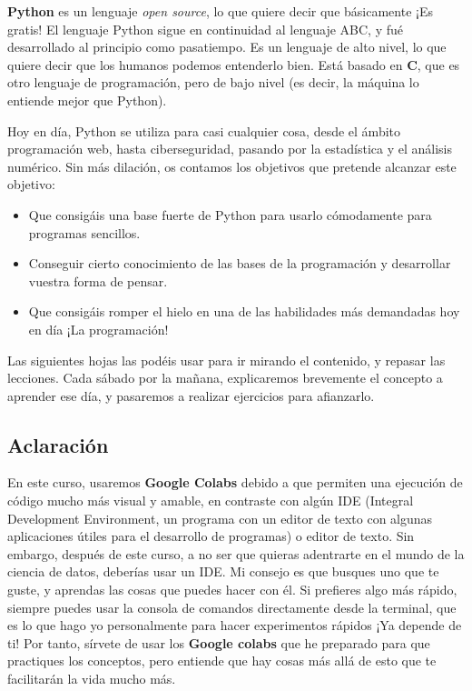 \documentclass{article}
\begin{document}
\textbf{Python} es un lenguaje \textit{open source}, lo que quiere decir que básicamente ¡Es gratis! El lenguaje Python sigue en continuidad al lenguaje ABC, y fué desarrollado al principio como pasatiempo. Es un lenguaje de alto nivel, lo que quiere decir que los humanos podemos entenderlo bien. Está basado en \textbf{C}, que es otro lenguaje de programación, pero de bajo nivel (es decir, la máquina lo entiende mejor que Python).


Hoy en día, Python se utiliza para casi cualquier cosa, desde el ámbito programación web, hasta ciberseguridad, pasando por la estadística y el análisis numérico.
Sin más dilación, os contamos los objetivos que pretende alcanzar este objetivo:

\begin{itemize}
    \item Que consigáis una base fuerte de Python para usarlo cómodamente para programas sencillos.
    \item Conseguir cierto conocimiento de las bases de la programación y desarrollar vuestra forma de pensar.
    \item Que consigáis romper el hielo en una de las habilidades más demandadas hoy en día ¡La programación!
\end{itemize}

Las siguientes hojas las podéis usar para ir mirando el contenido, y repasar las lecciones. Cada sábado por la mañana, explicaremos brevemente el concepto a aprender ese día, y pasaremos a realizar ejercicios para afianzarlo.
\subsection{Aclaración}
En este curso, usaremos \textbf{Google Colabs} debido a que permiten una ejecución de código mucho más visual y amable, en contraste con algún IDE (Integral Development Environment, un programa con un editor de texto con algunas aplicaciones útiles para el desarrollo de programas) o editor de texto. Sin embargo, después de este curso, a no ser que quieras adentrarte en el mundo de la ciencia de datos, deberías usar un IDE. Mi consejo es que busques uno que te guste, y aprendas las cosas que puedes hacer con él. Si prefieres algo más rápido, siempre puedes usar la consola de comandos directamente desde la terminal, que es lo que hago yo personalmente para hacer experimentos rápidos ¡Ya depende de ti! Por tanto, sírvete de usar los \textbf{Google colabs} que he preparado para que practiques los conceptos, pero entiende que hay cosas más allá de esto que te facilitarán la vida mucho más. 
\end{document}
